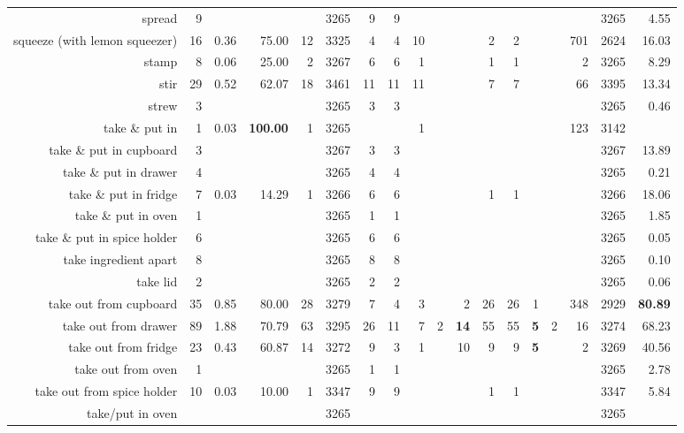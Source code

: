 \begin{tabular}{r r r@{\ \ }r@{\ \ }r@{\ \ }r@{\ \ }r r@{\ \ }r@{\ \ }r@{\ \ }r@{\ \ }r@{\ \ }r@{\ \ }r@{\ \ }r@{\ \ }r@{\ \ }r r}
spread & 9 &  &  &  & 3265 & 9 & 9 &  &  &  &  &  &  &  &  & 3265 & 4.55 \\
squeeze (with lemon squeezer) & 16 & 0.36 & 75.00 & 12 & 3325 & 4 & 4 & 10 &  &  & 2 & 2 &  &  & 701 & 2624 & 16.03 \\
stamp & 8 & 0.06 & 25.00 & 2 & 3267 & 6 & 6 & 1 &  &  & 1 & 1 &  &  & 2 & 3265 & 8.29 \\
stir & 29 & 0.52 & 62.07 & 18 & 3461 & 11 & 11 & 11 &  &  & 7 & 7 &  &  & 66 & 3395 & 13.34 \\
strew & 3 &  &  &  & 3265 & 3 & 3 &  &  &  &  &  &  &  &  & 3265 & 0.46 \\
take \& put in  & 1 & 0.03 & \textbf{100.00} & 1 & 3265 &  &  & 1 &  &  &  &  &  &  & 123 & 3142 &  \\
take \& put in cupboard & 3 &  &  &  & 3267 & 3 & 3 &  &  &  &  &  &  &  &  & 3267 & 13.89 \\
take \& put in drawer & 4 &  &  &  & 3265 & 4 & 4 &  &  &  &  &  &  &  &  & 3265 & 0.21 \\
take \& put in fridge & 7 & 0.03 & 14.29 & 1 & 3266 & 6 & 6 &  &  &  & 1 & 1 &  &  &  & 3266 & 18.06 \\
take \& put in oven & 1 &  &  &  & 3265 & 1 & 1 &  &  &  &  &  &  &  &  & 3265 & 1.85 \\
take \& put in spice holder & 6 &  &  &  & 3265 & 6 & 6 &  &  &  &  &  &  &  &  & 3265 & 0.05 \\
take ingredient apart & 8 &  &  &  & 3265 & 8 & 8 &  &  &  &  &  &  &  &  & 3265 & 0.10 \\
take lid & 2 &  &  &  & 3265 & 2 & 2 &  &  &  &  &  &  &  &  & 3265 & 0.06 \\
take out from cupboard & 35 & 0.85 & 80.00 & 28 & 3279 & 7 & 4 & 3 &  & 2 & 26 & 26 & 1 &  & 348 & 2929 & \textbf{80.89} \\
take out from drawer & 89 & 1.88 & 70.79 & 63 & 3295 & 26 & 11 & 7 & 2 & \textbf{14} & 55 & 55 & \textbf{5} & 2 & 16 & 3274 & 68.23 \\
take out from fridge & 23 & 0.43 & 60.87 & 14 & 3272 & 9 & 3 & 1 &  & 10 & 9 & 9 & \textbf{5} &  & 2 & 3269 & 40.56 \\
take out from oven & 1 &  &  &  & 3265 & 1 & 1 &  &  &  &  &  &  &  &  & 3265 & 2.78 \\
take out from spice holder & 10 & 0.03 & 10.00 & 1 & 3347 & 9 & 9 &  &  &  & 1 & 1 &  &  &  & 3347 & 5.84 \\
take/put in oven &  &  &  &  & 3265 &  &  &  &  &  &  &  &  &  &  & 3265 &  \\

\end{tabular}
